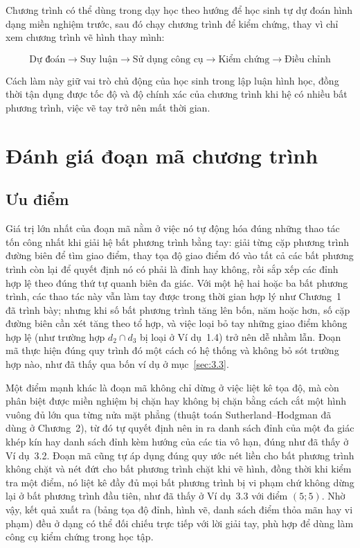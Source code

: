 \documentclass[12pt,a4paper]{report}
\begin{document}
Chương trình có thể dùng trong dạy học theo hướng để học sinh tự dự đoán hình dạng miền nghiệm trước, sau đó chạy chương trình để kiểm chứng, thay vì chỉ xem chương trình vẽ hình thay mình:

\begin{congthucbox}
\[
\text{Dự đoán} \to \text{Suy luận} \to \text{Sử dụng công cụ} \to \text{Kiểm chứng} \to \text{Điều chỉnh}
\]
\end{congthucbox}

Cách làm này giữ vai trò chủ động của học sinh trong lập luận hình học, đồng thời tận dụng được tốc độ và độ chính xác của chương trình khi hệ có nhiều bất phương trình, việc vẽ tay trở nên mất thời gian.

\section{Đánh giá đoạn mã chương trình}
\label{sec:3.5}

\subsection{Ưu điểm}

Giá trị lớn nhất của đoạn mã nằm ở việc nó tự động hóa đúng những thao tác tốn công nhất khi giải hệ bất phương trình bằng tay: giải từng cặp phương trình đường biên để tìm giao điểm, thay tọa độ giao điểm đó vào tất cả các bất phương trình còn lại để quyết định nó có phải là đỉnh hay không, rồi sắp xếp các đỉnh hợp lệ theo đúng thứ tự quanh biên đa giác. Với một hệ hai hoặc ba bất phương trình, các thao tác này vẫn làm tay được trong thời gian hợp lý như Chương~1 đã trình bày; nhưng khi số bất phương trình tăng lên bốn, năm hoặc hơn, số cặp đường biên cần xét tăng theo tổ hợp, và việc loại bỏ tay những giao điểm không hợp lệ (như trường hợp $d_2\cap d_3$ bị loại ở Ví dụ~1.4) trở nên dễ nhầm lẫn. Đoạn mã thực hiện đúng quy trình đó một cách có hệ thống và không bỏ sót trường hợp nào, như đã thấy qua bốn ví dụ ở mục~\ref{sec:3.3}.

Một điểm mạnh khác là đoạn mã không chỉ dừng ở việc liệt kê tọa độ, mà còn phân biệt được miền nghiệm bị chặn hay không bị chặn bằng cách cắt một hình vuông đủ lớn qua từng nửa mặt phẳng (thuật toán Sutherland–Hodgman đã dùng ở Chương~2), từ đó tự quyết định nên in ra danh sách đỉnh của một đa giác khép kín hay danh sách đỉnh kèm hướng của các tia vô hạn, đúng như đã thấy ở Ví dụ~3.2. Đoạn mã cũng tự áp dụng đúng quy ước nét liền cho bất phương trình không chặt và nét đứt cho bất phương trình chặt khi vẽ hình, đồng thời khi kiểm tra một điểm, nó liệt kê đầy đủ mọi bất phương trình bị vi phạm chứ không dừng lại ở bất phương trình đầu tiên, như đã thấy ở Ví dụ~3.3 với điểm $(5;5)$. Nhờ vậy, kết quả xuất ra (bảng tọa độ đỉnh, hình vẽ, danh sách điểm thỏa mãn hay vi phạm) đều ở dạng có thể đối chiếu trực tiếp với lời giải tay, phù hợp để dùng làm công cụ kiểm chứng trong học tập.
\end{document}

